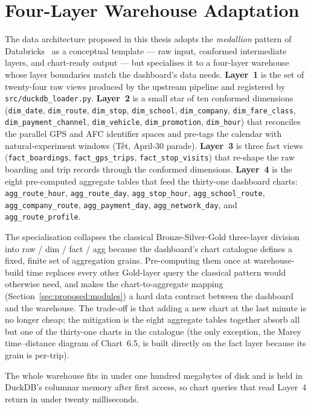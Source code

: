 \section{Four-Layer Warehouse Adaptation}
\label{sec:background:warehouse}

The data architecture proposed in this thesis adopts the
\emph{medallion} pattern of Databricks~\cite{databricksMedallion}
as a conceptual template --- raw input, conformed intermediate
layers, and chart-ready output --- but specialises it to a
four-layer warehouse whose layer boundaries match the dashboard's
data needs.
\textbf{Layer~1} is the set of twenty-four raw views produced by
the upstream pipeline and registered by
\texttt{src/duckdb\_loader.py}.
\textbf{Layer~2} is a small star of ten conformed dimensions
(\texttt{dim\_date}, \texttt{dim\_route}, \texttt{dim\_stop},
\texttt{dim\_school}, \texttt{dim\_company},
\texttt{dim\_fare\_class}, \texttt{dim\_payment\_channel},
\texttt{dim\_vehicle}, \texttt{dim\_promotion},
\texttt{dim\_hour}) that reconciles the parallel GPS and AFC
identifier spaces and pre-tags the calendar with natural-experiment
windows (Tết, April-30 parade).
\textbf{Layer~3} is three fact views (\texttt{fact\_boardings},
\texttt{fact\_gps\_trips}, \texttt{fact\_stop\_visits}) that
re-shape the raw boarding and trip records through the conformed
dimensions.
\textbf{Layer~4} is the eight pre-computed aggregate tables that
feed the thirty-one dashboard charts: \texttt{agg\_route\_hour},
\texttt{agg\_route\_day}, \texttt{agg\_stop\_hour},
\texttt{agg\_school\_route}, \texttt{agg\_company\_route},
\texttt{agg\_payment\_day}, \texttt{agg\_network\_day}, and
\texttt{agg\_route\_profile}.

The specialisation collapses the classical Bronze-Silver-Gold
three-layer division into raw / dim / fact / agg because the
dashboard's chart catalogue defines a fixed, finite set of
aggregation grains. Pre-computing them once at warehouse-build
time replaces every other Gold-layer query the classical
pattern would otherwise need, and makes the chart-to-aggregate
mapping (Section~\ref{sec:proposed:modules}) a hard data contract
between the dashboard and the warehouse. The trade-off is that
adding a new chart at the last minute is no longer cheap; the
mitigation is the eight aggregate tables together absorb all but
one of the thirty-one charts in the catalogue (the only exception,
the Marey time--distance diagram of Chart~6.5, is built directly
on the fact layer because its grain is per-trip).

The whole warehouse fits in under one hundred megabytes of disk
and is held in DuckDB's columnar memory after first access, so
chart queries that read Layer~4 return in under twenty
milliseconds.
